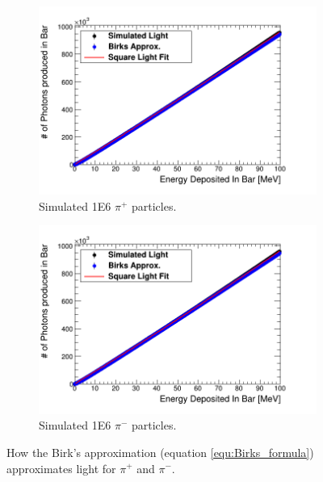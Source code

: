 \begin{figure}[htbp]
\centering
\begin{subfigure}{.5\textwidth}
  \centering
  \includegraphics[width=\linewidth]{Appendix5/newFigs/pi+BirksSlab_simAndApproxLight.png}
  \captionsetup{width=.9\linewidth}
  \caption{Simulated 1E6 $\pi^+$ particles.}
  \label{subfig:append5_light_of_pIPlus0-100mev}
\end{subfigure}%
\begin{subfigure}{.5\textwidth}
  \centering
  \includegraphics[width=\linewidth]{Appendix5/newFigs/pi-BirksSlab_simAndApproxLight.png}
  \captionsetup{width=.9\linewidth}
  \caption{Simulated 1E6 $\pi^-$ particles.}
  \label{subfig:append5_light_of_pIMinus0-100mev}
\end{subfigure}
\caption{How the Birk's approximation (equation \ref{equ:Birks_formula}) approximates light for $\pi^+$ and $\pi^-$.}
\label{fig:append5_light_of_pIPlus_pIMinus0-100mev}
\end{figure}

